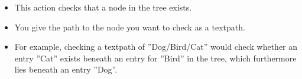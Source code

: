 \begin{itemize}
\item This action checks that a node in the tree exists.
\item You give the path to the node you want to check as a textpath. 
\item For example, checking a textpath of ''Dog/Bird/Cat'' would check whether  an entry ''Cat'' exists beneath an entry for ''Bird'' in the tree,
which furthermore lies beneath an entry ''Dog''.
\end{itemize}

